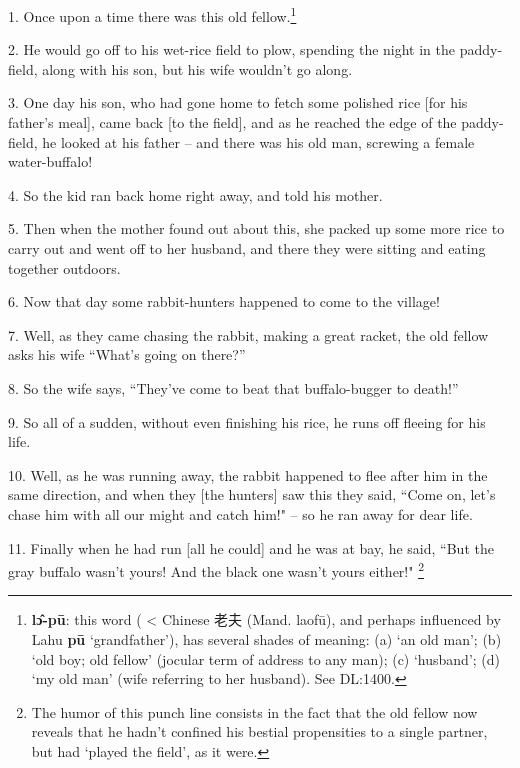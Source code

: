 \setcounter{footnote}{0}

1. Once upon a time there was this old fellow.\footnote{\textbf{lɔ̂-pū}: this word ( < Chinese 老夫 (Mand. laofū), and perhaps influenced by Lahu \textbf{pū} `grandfather'), has several shades of meaning: (a) `an old man'; (b) `old boy; old fellow' (jocular term of address to any man); (c) `husband'; (d) `my old man' (wife referring to her husband). See DL:1400.}

2. He would go off to his wet-rice field to plow, spending the night in the paddy-field,
along with his son, but his wife wouldn't go along.

3. One day his son, who had gone home to fetch some polished rice [for his father's
meal], came back [to the field], and as he reached the edge of the paddy-field,
he looked at his father -- and there was his old man, screwing a female water-buffalo!

4. So the kid ran back home right away, and told his mother.

5. Then when the mother found out about this, she packed up some more rice to carry
out and went off to her husband, and there they were sitting and eating together
outdoors.

6. Now that day some rabbit-hunters happened to come to the village!

7. Well, as they came chasing the rabbit, making a great racket, the old fellow
asks his wife ``What's going on there?''

8. So the wife says, ``They've come to beat that buffalo-bugger to death!''

9. So all of a sudden, without even finishing his rice, he runs off fleeing for
his life.

10. Well, as he was running away, the rabbit happened to flee after him in the
same direction, and when they [the hunters] saw this they said, ``Come
on, let's chase him with all our might and catch him!" -- so he ran away
for dear life.

11. Finally when he had run [all he could] and he was at bay, he said, ``But
the gray buffalo wasn't yours! And the black one wasn't yours either!"
\footnote{The humor of this punch line consists in the fact that the old fellow now reveals that he hadn't confined his bestial propensities to a single partner, but had `played the field', as it were.}

